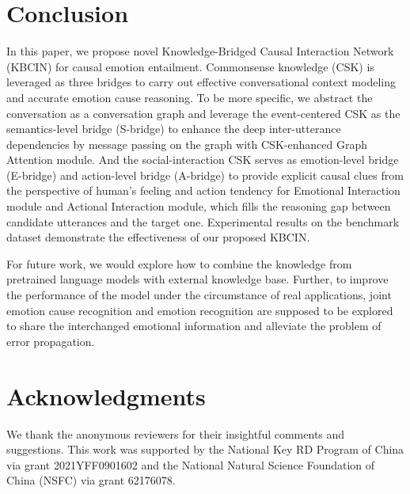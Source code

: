 \documentclass[letterpaper]{article} \usepackage{aaai23}  \usepackage{times}  \usepackage{helvet}  \usepackage{courier}  \usepackage[hyphens]{url}  \usepackage{graphicx} \urlstyle{rm} \def\UrlFont{\rm}  \usepackage{natbib}  \usepackage{caption} \frenchspacing  \setlength{\pdfpagewidth}{8.5in} \setlength{\pdfpageheight}{11in} \usepackage{algorithm}
\begin{document}
\section{Conclusion}
In this paper, we propose novel Knowledge-Bridged Causal Interaction Network (KBCIN) for causal emotion entailment. Commonsense knowledge (CSK) is leveraged as three bridges to carry out effective conversational context modeling and accurate emotion cause reasoning. To be more specific, we abstract the conversation as a conversation graph and leverage the event-centered CSK as the semantics-level bridge (S-bridge) to enhance the deep inter-utterance dependencies by message passing on the graph with CSK-enhanced Graph Attention module. And the social-interaction CSK serves as emotion-level bridge (E-bridge) and action-level bridge (A-bridge) to provide explicit causal clues from the perspective of human's feeling and action tendency for Emotional Interaction module and Actional Interaction module, which fills the reasoning gap between candidate utterances and the target one. Experimental results on the benchmark dataset demonstrate the effectiveness of our proposed KBCIN.

For future work, we would explore how to combine the knowledge from pretrained language models with external knowledge base. Further, to improve the performance of the model under the circumstance of real applications, joint emotion cause recognition and emotion recognition are supposed to be explored to share the interchanged emotional information and alleviate the problem of error propagation.

\section*{Acknowledgments}
We thank the anonymous reviewers for their insightful comments and suggestions. This work was supported by the National Key RD Program of China via grant  2021YFF0901602 and the National Natural Science Foundation of China (NSFC) via grant 62176078.

\appendix

\label{sec:reference_examples}


\end{document}
